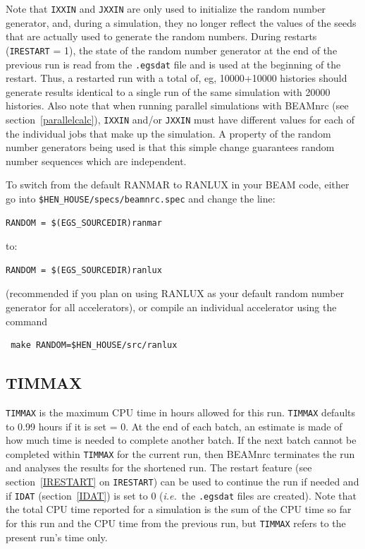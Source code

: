 \documentclass[12pt,twoside]{article}
\newcommand{\ie}{{\em i.e.}}
\begin{document}
Note that \verb+IXXIN+ and \verb+JXXIN+ are only used to initialize
the random number generator, and, during a simulation, they no longer
reflect the values of the seeds that are actually used to generate
the random numbers.
During restarts
({\tt IRESTART} = 1), the state of the random number generator at the end
of the previous run is read from the {\tt .egsdat} file and is used at the
beginning of the restart.  Thus, a restarted run with a total of, eg,
10000+10000 histories should generate results identical to a single run
of the same simulation with 20000 histories.  Also note that when running
parallel simulations with BEAMnrc (see section~\ref{parallelcalc}), {\tt IXXIN}
and/or {\tt JXXIN} must have different values for each of the individual jobs
that make up the simulation. A property of the random number generators being
used is that this simple change guarantees random number sequences which are
independent.

To switch from the default RANMAR to RANLUX in your BEAM code, either go into
{\tt \$HEN\_HOUSE/specs/beamnrc.spec} and change the line:
\begin{verbatim}
RANDOM = $(EGS_SOURCEDIR)ranmar
\end{verbatim}
to:
\begin{verbatim}
RANDOM = $(EGS_SOURCEDIR)ranlux
\end{verbatim}
(recommended if you plan on using RANLUX as your default random
number generator for all accelerators),
or compile an individual accelerator using the command
\begin{verbatim}
 make RANDOM=$HEN_HOUSE/src/ranlux
\end{verbatim}

\subsection{TIMMAX}

\verb+TIMMAX+ is the maximum CPU time in hours allowed for this run.
\verb+TIMMAX+ defaults to 0.99 hours if it is set = 0.
At the end of each batch, an estimate is made of how much time is needed
to complete another batch. If the next batch cannot be completed within
\verb+TIMMAX+ for the current run, then BEAMnrc terminates the run and
analyses the results for the shortened run.  The restart feature (see
section~\ref{IRESTART} on \verb+IRESTART+) can be used to continue the
run if needed and if \verb+IDAT+ (section~\ref{IDAT}) is set to 0 (\ie\ the
{\tt .egsdat} files are created).
Note that the total CPU time
reported for a simulation is the sum of the CPU time so far for this run and
the CPU time from the previous run, but \verb+TIMMAX+ refers to the
present run's time only.
\end{document}
